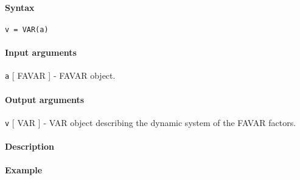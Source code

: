 


	\paragraph{Syntax}\label{syntax}

\begin{verbatim}
v = VAR(a)
\end{verbatim}

\paragraph{Input arguments}\label{input-arguments}

\texttt{a} {[} FAVAR {]} - FAVAR object.

\paragraph{Output arguments}\label{output-arguments}

\texttt{v} {[} VAR {]} - VAR object describing the dynamic system of the
FAVAR factors.

\paragraph{Description}\label{description}

\paragraph{Example}\label{example}


